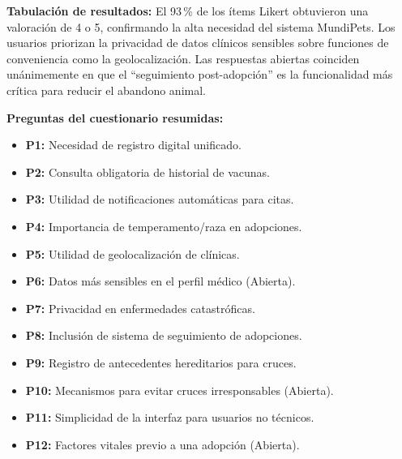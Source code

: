 \documentclass[journal,onecolumn]{IEEEtran}
\begin{document}
\textbf{Tabulación de resultados:} El 93\,\% de los ítems Likert obtuvieron una valoración de 4 o 5, confirmando la alta necesidad del sistema MundiPets. Los usuarios priorizan la privacidad de datos clínicos sensibles sobre funciones de conveniencia como la geolocalización. Las respuestas abiertas coinciden unánimemente en que el ``seguimiento post-adopción'' es la funcionalidad más crítica para reducir el abandono animal.

\vspace{0.5em}
\noindent\textbf{Preguntas del cuestionario resumidas:}
\begin{itemize}[leftmargin=*, noitemsep]
	\item \textbf{P1:} Necesidad de registro digital unificado.
	\item \textbf{P2:} Consulta obligatoria de historial de vacunas.
	\item \textbf{P3:} Utilidad de notificaciones automáticas para citas.
	\item \textbf{P4:} Importancia de temperamento/raza en adopciones.
	\item \textbf{P5:} Utilidad de geolocalización de clínicas.
	\item \textbf{P6:} Datos más sensibles en el perfil médico (Abierta).
	\item \textbf{P7:} Privacidad en enfermedades catastróficas.
	\item \textbf{P8:} Inclusión de sistema de seguimiento de adopciones.
	\item \textbf{P9:} Registro de antecedentes hereditarios para cruces.
	\item \textbf{P10:} Mecanismos para evitar cruces irresponsables (Abierta).
	\item \textbf{P11:} Simplicidad de la interfaz para usuarios no técnicos.
	\item \textbf{P12:} Factores vitales previo a una adopción (Abierta).
\end{itemize}

\vspace{0.5em}
\end{document}
